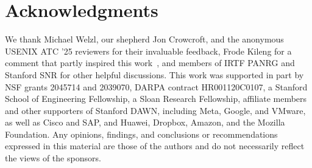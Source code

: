 \section*{Acknowledgments}




We thank Michael Welzl, our shepherd Jon Crowcroft, and the anonymous USENIX
ATC '25 reviewers for their invaluable feedback, Frode Kileng for a comment
that partly inspired this work~\cite{frode}, and members of IRTF PANRG and
Stanford SNR for other helpful discussions. This work was supported in part by
NSF grants 2045714 and 2039070, DARPA contract HR001120C0107, a Stanford School
of Engineering Fellowship, a Sloan Research Fellowship, affiliate members and
other supporters of Stanford DAWN, including Meta, Google, and VMware, as well
as Cisco and SAP, and Huawei, Dropbox, Amazon, and the Mozilla Foundation. Any
opinions, findings, and conclusions or recommendations expressed in this
material are those of the authors and do not necessarily reflect the views of
the sponsors.
